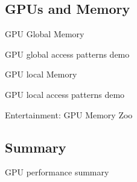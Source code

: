 \documentclass[english,compress]{beamer}
\begin{document}
\subsection{GPUs and Memory}


\begin{frame}{GPU Global Memory}
  \begin{center}
  \Huge GPU global access patterns demo
  \end{center}
\end{frame}

\begin{frame}{GPU local Memory}
  \begin{center}
  \Huge GPU local access patterns demo
  \end{center}
\end{frame}
\begin{frame}{Entertainment: GPU Memory Zoo}


\end{frame}
\subsection{Summary}
\begin{frame}{GPU performance summary}
\end{frame}



% 
% 


\questionframe{}
\imagecreditslide
\end{document}
